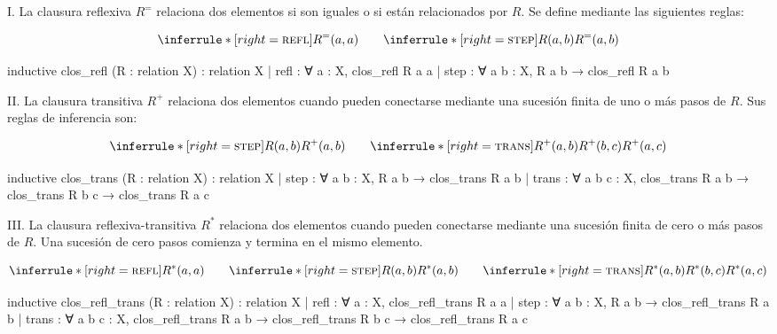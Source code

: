 \documentclass[
  spanish,
  letterpaper,
  DIV=11,
  numbers=noendperiod]{scrreprt}
\newenvironment{Shaded}{\begin{snugshade}}{\end{snugshade}}
\newcommand{\NormalTok}[1]{\textcolor[rgb]{0.00,0.23,0.31}{#1}}
\renewcommand{\NormalTok}[1]{\textcolor[HTML]{000000}{#1}}
\theoremstyle{remark}
\begin{document}
I. La clausura reflexiva \(R^{=}\) relaciona dos elementos si son
iguales o si están relacionados por \(R\). Se define mediante las
siguientes reglas:

\[
\inferrule*[right=\textsc{refl}]
  { }
  {R^=(a,a)}
\qquad
\inferrule*[right=\textsc{step}]
  {R(a,b)}
  {R^=(a,b)}
\]

\begin{Shaded}
\begin{Highlighting}[]
\NormalTok{inductive clos\_refl (R : relation X) : relation X}
\NormalTok{  | refl : ∀ a : X,}
\NormalTok{      clos\_refl R a a}
\NormalTok{  | step : ∀ a b : X,}
\NormalTok{      R a b → clos\_refl R a b}
\end{Highlighting}
\end{Shaded}

II. La clausura transitiva \(R^{+}\) relaciona dos elementos cuando
pueden conectarse mediante una sucesión finita de uno o más pasos de
\(R\). Sus reglas de inferencia son:

\[
\inferrule*[right=\textsc{step}]
  {R(a,b)}
  {R^+(a,b)}
\qquad
\inferrule*[right=\textsc{trans}]
  {R^+(a,b) \\
   R^+(b,c)}
  {R^+(a,c)}
\]

\begin{Shaded}
\begin{Highlighting}[]
\NormalTok{inductive clos\_trans (R : relation X) : relation X}
\NormalTok{  | step : ∀ a b : X,}
\NormalTok{      R a b → clos\_trans R a b}
\NormalTok{  | trans : ∀ a b c : X,}
\NormalTok{      clos\_trans R a b → clos\_trans R b c →}
\NormalTok{      clos\_trans R a c}
\end{Highlighting}
\end{Shaded}

III. La clausura reflexiva-transitiva \(R^*\) relaciona dos elementos
cuando pueden conectarse mediante una sucesión finita de cero o más
pasos de \(R\). Una sucesión de cero pasos comienza y termina en el
mismo elemento.

\[
\inferrule*[right=\textsc{refl}]
  { }
  {R^*(a,a)}
\qquad
\inferrule*[right=\textsc{step}]
  {R(a,b)}
  {R^*(a,b)}
\qquad
\inferrule*[right=\textsc{trans}]
  {R^*(a,b) \\
   R^*(b,c)}
  {R^*(a,c)}
\]

\begin{Shaded}
\begin{Highlighting}[]
\NormalTok{inductive clos\_refl\_trans (R : relation X) : relation X}
\NormalTok{  | refl : ∀ a : X,}
\NormalTok{      clos\_refl\_trans R a a}
\NormalTok{  | step : ∀ a b : X,}
\NormalTok{      R a b → clos\_refl\_trans R a b}
\NormalTok{  | trans : ∀ a b c : X,}
\NormalTok{      clos\_refl\_trans R a b → clos\_refl\_trans R b c →}
\NormalTok{      clos\_refl\_trans R a c}
\end{Highlighting}
\end{Shaded}
\end{document}
